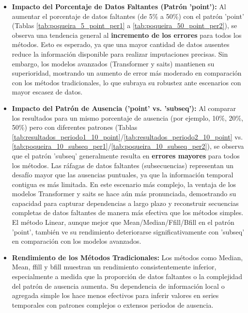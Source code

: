 \begin{itemize}
    \item \textbf{Impacto del Porcentaje de Datos Faltantes (Patrón 'point'):}
    Al aumentar el porcentaje de datos faltantes (de 5\% a 50\%) con el patrón 'point' (Tablas \ref{tab:poqueira_5_point_per1} a \ref{tab:poqueira_50_point_per2}), se observa una tendencia general al \textbf{incremento de los errores} para todos los métodos. Esto es esperado, ya que una mayor cantidad de datos ausentes reduce la información disponible para realizar imputaciones precisas. Sin embargo, los modelos avanzados (Transformer y \gls{saits}) mantienen su superioridad, mostrando un aumento de error más moderado en comparación con los métodos tradicionales, lo que subraya su robustez ante escenarios con mayor escasez de datos.

    \item \textbf{Impacto del Patrón de Ausencia ('point' vs. 'subseq'):}
    Al comparar los resultados para un mismo porcentaje de ausencia (por ejemplo, 10\%, 20\%, 50\%) pero con diferentes patrones (Tablas \ref{tab:resultados_periodo1_10_point}/\ref{tab:resultados_periodo2_10_point} vs. \ref{tab:poqueira_10_subseq_per1}/\ref{tab:poqueira_10_subseq_per2}), se observa que el patrón 'subseq' generalmente resulta en \textbf{errores mayores} para todos los métodos. Las ráfagas de datos faltantes (subsecuencias) representan un desafío mayor que las ausencias puntuales, ya que la información temporal contigua es más limitada. En este escenario más complejo, la ventaja de los modelos Transformer y \gls{saits} se hace aún más pronunciada, demostrando su capacidad para capturar dependencias a largo plazo y reconstruir secuencias completas de datos faltantes de manera más efectiva que los métodos simples. El método Linear, aunque mejor que Mean/Median/Ffill/Bfill en el patrón 'point', también ve su rendimiento deteriorarse significativamente con 'subseq' en comparación con los modelos avanzados.

    \item \textbf{Rendimiento de los Métodos Tradicionales:}
    Los métodos como Median, Mean, \gls{ffill} y \gls{bfill} muestran un rendimiento consistentemente inferior, especialmente a medida que la proporción de datos faltantes o la complejidad del patrón de ausencia aumenta. Su dependencia de información local o agregada simple los hace menos efectivos para inferir valores en series temporales con patrones complejos o extensos periodos de ausencia.

\end{itemize}

